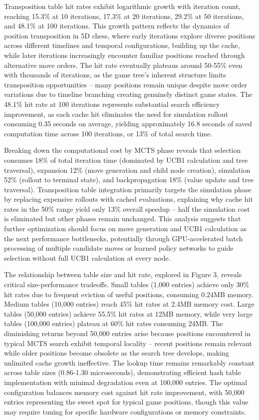 \documentclass{article}
\begin{document}
Transposition table hit rates exhibit logarithmic growth with iteration count, reaching 15.3\% at 10 iterations, 17.3\% at 20 iterations, 29.2\% at 50 iterations, and 48.1\% at 100 iterations. This growth pattern reflects the dynamics of position transposition in 5D chess, where early iterations explore diverse positions across different timelines and temporal configurations, building up the cache, while later iterations increasingly encounter familiar positions reached through alternative move orders. The hit rate eventually plateaus around 50-55\% even with thousands of iterations, as the game tree's inherent structure limits transposition opportunities – many positions remain unique despite move order variations due to timeline branching creating genuinely distinct game states. The 48.1\% hit rate at 100 iterations represents substantial search efficiency improvement, as each cache hit eliminates the need for simulation rollout consuming 0.35 seconds on average, yielding approximately 16.8 seconds of saved computation time across 100 iterations, or 13\% of total search time.

Breaking down the computational cost by MCTS phase reveals that selection consumes 18\% of total iteration time (dominated by UCB1 calculation and tree traversal), expansion 12\% (move generation and child node creation), simulation 52\% (rollout to terminal state), and backpropagation 18\% (value update and tree traversal). Transposition table integration primarily targets the simulation phase by replacing expensive rollouts with cached evaluations, explaining why cache hit rates in the 50\% range yield only 13\% overall speedup – half the simulation cost is eliminated but other phases remain unchanged. This analysis suggests that further optimization should focus on move generation and UCB1 calculation as the next performance bottlenecks, potentially through GPU-accelerated batch processing of multiple candidate moves or learned policy networks to guide selection without full UCB1 calculation at every node.

The relationship between table size and hit rate, explored in Figure 3, reveals critical size-performance tradeoffs. Small tables (1,000 entries) achieve only 30\% hit rates due to frequent eviction of useful positions, consuming 0.24MB memory. Medium tables (10,000 entries) reach 45\% hit rates at 2.4MB memory cost. Large tables (50,000 entries) achieve 55.5\% hit rates at 12MB memory, while very large tables (100,000 entries) plateau at 60\% hit rates consuming 24MB. The diminishing returns beyond 50,000 entries arise because positions encountered in typical MCTS search exhibit temporal locality – recent positions remain relevant while older positions become obsolete as the search tree develops, making unlimited cache growth ineffective. The lookup time remains remarkably constant across table sizes (0.86-1.30 microseconds), demonstrating efficient hash table implementation with minimal degradation even at 100,000 entries. The optimal configuration balances memory cost against hit rate improvement, with 50,000 entries representing the sweet spot for typical game positions, though this value may require tuning for specific hardware configurations or memory constraints.
\end{document}
